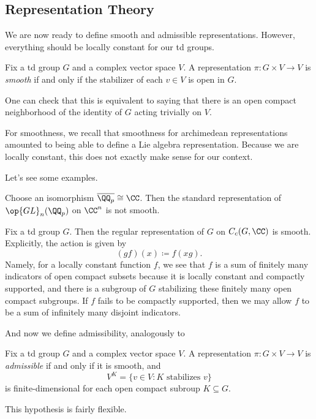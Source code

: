\documentclass{article}
\begin{document}
\subsection{Representation Theory}
We are now ready to define smooth and admissible representations. However, everything should be locally constant for our td groups.
\begin{definition}[smooth]
	Fix a td group $G$ and a complex vector space $V$. A representation $\pi\colon G\times V\to V$ is \textit{smooth} if and only if the stabilizer of each $v\in V$ is open in $G$.
\end{definition}
\begin{remark}
	One can check that this is equivalent to saying that there is an open compact neighborhood of the identity of $G$ acting trivially on $V$.
\end{remark}
\begin{remark}
	For smoothness, we recall that smoothness for archimedean representations amounted to being able to define a Lie algebra representation. Because we are locally constant, this does not exactly make sense for our context.
\end{remark}
Let's see some examples.
\begin{nex}
	Choose an isomorphism $\overline{\QQ_p}\cong\CC$. Then the standard representation of $\op{GL}_n(\QQ_p)$ on $\CC^n$ is not smooth.
\end{nex}
\begin{example}
	Fix a td group $G$. Then the regular representation of $G$ on $C_c(G,\CC)$ is smooth. Explicitly, the action is given by
	\[(gf)(x)\coloneqq f(xg).\]
	Namely, for a locally constant function $f$, we see that $f$ is a sum of finitely many indicators of open compact subsets because it is locally constant and compactly supported, and there is a subgroup of $G$ stabilizing these finitely many open compact subgroups. If $f$ fails to be compactly supported, then we may allow $f$ to be a sum of infinitely many disjoint indicators.
\end{example}
And now we define admissibility, analogously to 
\begin{definition}[admissible]
	Fix a td group $G$ and a complex vector space $V$. A representation $\pi\colon G\times V\to V$ is \textit{admissible} if and only if it is smooth, and
	\[V^K=\{v\in V:K\text{ stabilizes }v\}\]
	is finite-dimensional for each open compact subroup $K\subseteq G$.
\end{definition}
This hypothesis is fairly flexible.
\end{document}
